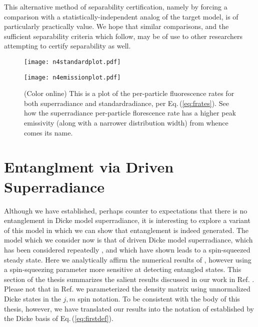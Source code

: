 \documentclass[
  12pt          %
  ,letterpaper  %
  ,center       %
  ,noupper      %
  ,english,fleqn]{uconnthesis}
\let\stdsection\section
\renewcommand\section{\newpage\stdsection}
\newcommand{\ceq}[1]{Eq.\,(\ref{#1})}
\newcommand{\fig}[1]{Fig.\,\ref{#1}}
\begin{document}
This alternative method of separability certification, namely by forcing a comparison with a statistically-independent analog of the target model, is of particularly practically value. We hope that similar comparisons, and the sufficient separability criteria which follow, may be of use to other researchers attempting to certify separability as well.



\begin{figure}[p]
    \texttt{[image: n4standardplot.pdf]}
    \caption{(Color online) Standardradiance populations as a function of time, per \ceq{eq:standardrad} and \ceq{eq:newsepform}. The system starts out entirely in the maximally excited state and evolves towards existing entirely in the ground state. At intermediate times the system is a mixture of populations. Note that the evolution is ``slower'' than that of superradiance; note the much shorter timescale plotted in \fig{fig:n4superplot}.}\label{fig:n4standardplot}
\vspace{49pt}
    \texttt{[image: n4emissionplot.pdf]}
    \caption{(Color online) This is a plot of the per-particle fluorescence rates for both superradiance and standardradiance, per \ceq{eq:frates}. See how the superradiance per-particle florescence rate has a higher peak emissivity (along with a narrower distribution width) from whence comes its name. }\label{fig:n4emissionplot}
\end{figure}
\FloatBarrier

\section{Entanglment via Driven Superradiance}
Although we have established, perhaps counter to expectations that there is no entanglement in Dicke model superradiance, it is interesting to explore a variant of this model in which we can show that entanglement is indeed generated. The model which we consider now is that of driven Dicke model superradiance, which has been considered repeatedly \cite{Drummund1978,Drummond1980,Breuer2007Theory,superrad2010,DrivenSuperradAlmost,DrivenSuperradPorras}, and which \citet{DrivenSuperradPorras} have shown leads to a spin-squeezed steady state. Here we analytically affirm the numerical results of \citet{DrivenSuperradPorras}, however using a spin-squeezing parameter more sensitive at detecting entangled states. This section of the thesis summarizes the salient results discussed in our work in Ref. \cite{DrivenSuperrad}. Please not that in Ref. \cite{DrivenSuperrad} we parameterized the density matrix using unnormalized Dicke states in the $j,m$ spin notation. To be consistent with the body of this thesis, however, we have translated our results into the notation of established by the Dicke basis of \ceq{eq:firstdef}.
\end{document}
